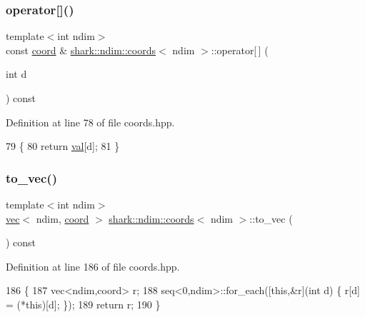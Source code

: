 \subsubsection{\texorpdfstring{operator[]()}{operator[]()}\hspace{0.1cm}{\footnotesize\ttfamily [2/2]}}
{\footnotesize\ttfamily template$<$int ndim$>$ \\
const \hyperlink{namespaceshark_a767a92d5dd82cb82266473bff42fa6d9}{coord} \& \hyperlink{structshark_1_1ndim_1_1coords}{shark\+::ndim\+::coords}$<$ ndim $>$\+::operator\mbox{[}$\,$\mbox{]} (\begin{DoxyParamCaption}\item[{int}]{d }\end{DoxyParamCaption}) const\hspace{0.3cm}{\ttfamily [inline]}}



Definition at line 78 of file coords.\+hpp.


\begin{DoxyCode}
79         \{
80             \textcolor{keywordflow}{return} \hyperlink{structshark_1_1ndim_1_1coords_a425262af388367b0f0079218e038aef5}{val}[d];
81         \}
\end{DoxyCode}
\hypertarget{structshark_1_1ndim_1_1coords_a5fb26fdaeb752fd27576e4948f1d0a98}{}\label{structshark_1_1ndim_1_1coords_a5fb26fdaeb752fd27576e4948f1d0a98} 
\subsubsection{\texorpdfstring{to\+\_\+vec()}{to\_vec()}}
{\footnotesize\ttfamily template$<$int ndim$>$ \\
\hyperlink{structshark_1_1ndim_1_1vec}{vec}$<$ ndim, \hyperlink{namespaceshark_a767a92d5dd82cb82266473bff42fa6d9}{coord} $>$ \hyperlink{structshark_1_1ndim_1_1coords}{shark\+::ndim\+::coords}$<$ ndim $>$\+::to\+\_\+vec (\begin{DoxyParamCaption}{ }\end{DoxyParamCaption}) const\hspace{0.3cm}{\ttfamily [inline]}}



Definition at line 186 of file coords.\+hpp.


\begin{DoxyCode}
186                                                           \{
187             vec<ndim,coord> r;
188             seq<0,ndim>::for\_each([\textcolor{keyword}{this},&r](\textcolor{keywordtype}{int} d) \{ r[d] = (*this)[d]; \});
189             \textcolor{keywordflow}{return} r;
190         \}
\end{DoxyCode}


